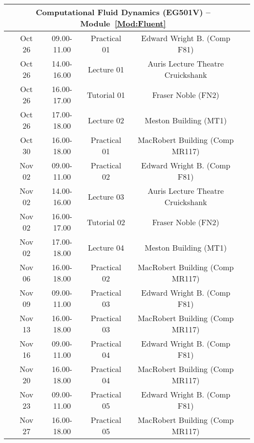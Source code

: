 \documentclass[12pts,a4paper,amsmath,amssymb,floatfix]{article}%
\begin{document}
\begin{center}
\begin{tabular}{||c||c|c|c|c|c||}
\hline\hline
\multicolumn{5}{||c||}{Computational Fluid Dynamics (EG501V) --  Module~\ref{Mod:Fluent}} \\
\hline\hline
\multirow{5}{*}{\color{red}{Week 13}} & Oct 26    & 09.00-11.00 & Practical 01 & Edward Wright B. (Comp F81)       \\
                                      & Oct 26    & 14.00-16.00 & Lecture 01   & Auris Lecture Theatre Cruickshank \\
                                      & Oct 26    & 16.00-17.00 & Tutorial 01  & Fraser Noble (FN2)                \\
                                      & Oct 26    & 17.00-18.00 & Lecture 02   & Meston Building (MT1)             \\
                                      & Oct 30    & 16.00-18.00 & Practical 01 & MacRobert Building (Comp MR117)   \\
\hline
\multirow{5}{*}{\color{red}{Week 14}} & Nov 02    & 09.00-11.00 & Practical 02 & Edward Wright B. (Comp F81)       \\
                                      & Nov 02    & 14.00-16.00 & Lecture 03   & Auris Lecture Theatre Cruickshank \\
                                      & Nov 02    & 16.00-17.00 & Tutorial 02  & Fraser Noble (FN2)                \\
                                      & Nov 02    & 17.00-18.00 & Lecture 04  & Meston Building (MT1)              \\
                                      & Nov 06    & 16.00-18.00 & Practical 02 & MacRobert Building (Comp MR117)   \\
\hline
\multirow{2}{*}{\color{red}{Week 15}} & Nov 09    & 09.00-11.00 & Practical 03 & Edward Wright B. (Comp F81)       \\
                                      & Nov 13    & 16.00-18.00 & Practical 03 & MacRobert Building (Comp MR117)   \\
\hline
\multirow{2}{*}{\color{red}{Week 16}} & Nov 16    & 09.00-11.00 & Practical 04 & Edward Wright B. (Comp F81)       \\
                                      & Nov 20    & 16.00-18.00 & Practical 04 & MacRobert Building (Comp MR117)   \\
\hline
\multirow{2}{*}{\color{red}{Week 17}} & Nov 23    & 09.00-11.00 & Practical 05 & Edward Wright B. (Comp F81)       \\
                                      & Nov 27    & 16.00-18.00 & Practical 05 & MacRobert Building (Comp MR117)   \\
\hline\hline

\end{tabular}
\end{center}
\end{document}
